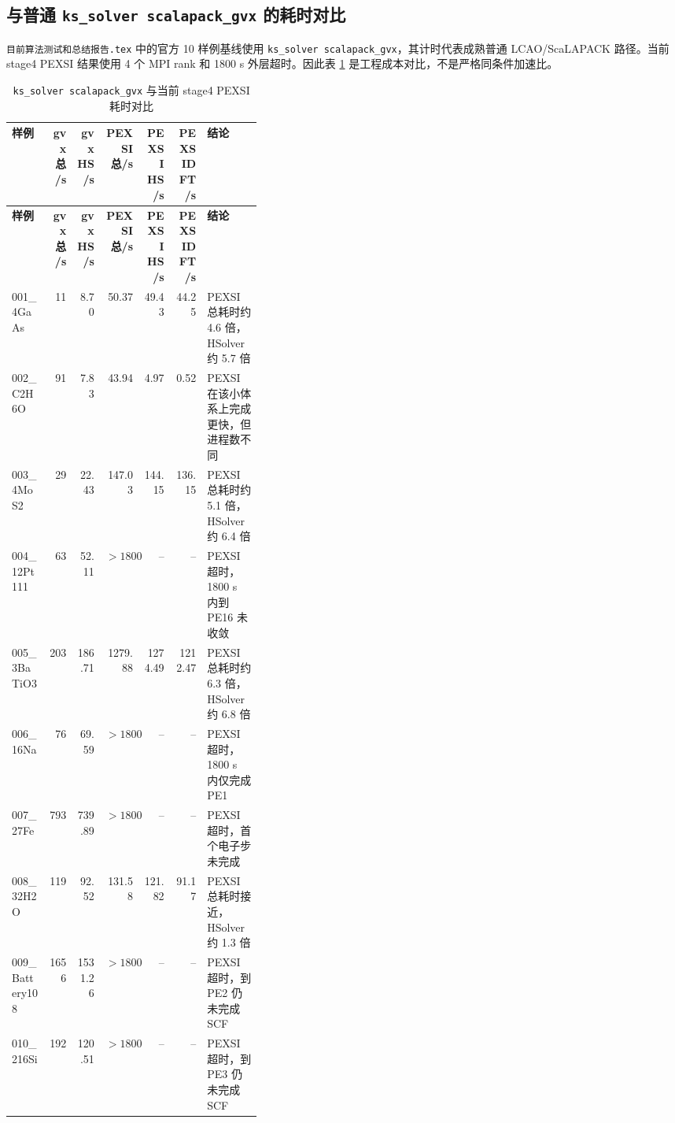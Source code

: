 \documentclass[a4paper,11pt]{article}
\newcommand{\code}[1]{\texttt{#1}}
\begin{document}
\subsection{与普通 \code{ks\_solver scalapack\_gvx} 的耗时对比}

\code{目前算法测试和总结报告.tex} 中的官方 10 样例基线使用 \code{ks\_solver scalapack\_gvx}，其计时代表成熟普通 LCAO/ScaLAPACK 路径。当前 stage4 PEXSI 结果使用 4 个 MPI rank 和 1800 s 外层超时。因此表 \ref{tab:ksolver-pexsi-time} 是工程成本对比，不是严格同条件加速比。

{\scriptsize
\begin{longtable}{@{}p{0.15\linewidth}r r r r r p{0.22\linewidth}@{}}
\caption{\code{ks\_solver scalapack\_gvx} 与当前 stage4 PEXSI 耗时对比}
\label{tab:ksolver-pexsi-time}\\
\toprule
\textbf{样例} & \textbf{gvx 总/s} & \textbf{gvx HS/s} & \textbf{PEXSI 总/s} & \textbf{PEXSI HS/s} & \textbf{PEXSIDFT/s} & \textbf{结论}\\
\midrule
\endfirsthead
\toprule
\textbf{样例} & \textbf{gvx 总/s} & \textbf{gvx HS/s} & \textbf{PEXSI 总/s} & \textbf{PEXSI HS/s} & \textbf{PEXSIDFT/s} & \textbf{结论}\\
\midrule
\endhead
001\_4GaAs & 11 & 8.70 & 50.37 & 49.43 & 44.25 & PEXSI 总耗时约 4.6 倍，HSolver 约 5.7 倍\\
002\_C2H6O & 91 & 7.83 & 43.94 & 4.97 & 0.52 & PEXSI 在该小体系上完成更快，但进程数不同\\
003\_4MoS2 & 29 & 22.43 & 147.03 & 144.15 & 136.15 & PEXSI 总耗时约 5.1 倍，HSolver 约 6.4 倍\\
004\_12Pt111 & 63 & 52.11 & \(>1800\) & -- & -- & PEXSI 超时，1800 s 内到 PE16 未收敛\\
005\_3BaTiO3 & 203 & 186.71 & 1279.88 & 1274.49 & 1212.47 & PEXSI 总耗时约 6.3 倍，HSolver 约 6.8 倍\\
006\_16Na & 76 & 69.59 & \(>1800\) & -- & -- & PEXSI 超时，1800 s 内仅完成 PE1\\
007\_27Fe & 793 & 739.89 & \(>1800\) & -- & -- & PEXSI 超时，首个电子步未完成\\
008\_32H2O & 119 & 92.52 & 131.58 & 121.82 & 91.17 & PEXSI 总耗时接近，HSolver 约 1.3 倍\\
009\_Battery108 & 1656 & 1531.26 & \(>1800\) & -- & -- & PEXSI 超时，到 PE2 仍未完成 SCF\\
010\_216Si & 192 & 120.51 & \(>1800\) & -- & -- & PEXSI 超时，到 PE3 仍未完成 SCF\\
\bottomrule
\end{longtable}
}
\end{document}
